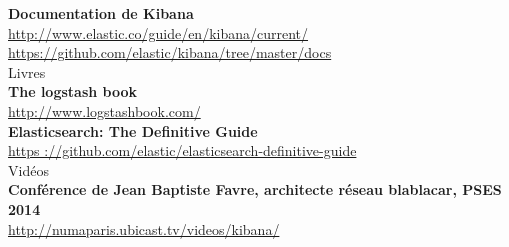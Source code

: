 \textbf{Documentation de Kibana}\\
\url{http://www.elastic.co/guide/en/kibana/current/}\\
\url{https://github.com/elastic/kibana/tree/master/docs}\\[3mm]


{\huge Livres}\\[5mm]

\textbf{The logstash book}\\
\url{http://www.logstashbook.com/}\\[1mm]

\textbf{Elasticsearch: The Definitive Guide}\\
\url{https ://github.com/elastic/elasticsearch-definitive-guide}\\[1mm]

{\huge Vidéos}\\[5mm]

\textbf{Conférence de Jean Baptiste Favre, architecte réseau blablacar, PSES 2014}\\
\url{http://numaparis.ubicast.tv/videos/kibana/}\\[3mm]

